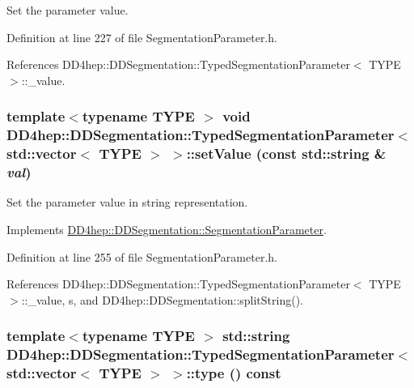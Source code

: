 Set the parameter value. 

Definition at line 227 of file SegmentationParameter.h.

References DD4hep::DDSegmentation::TypedSegmentationParameter$<$ TYPE $>$::\_\-value.\hypertarget{class_d_d4hep_1_1_d_d_segmentation_1_1_typed_segmentation_parameter_3_01std_1_1vector_3_01_t_y_p_e_01_4_01_4_ad36f5a4953d42c4d9252423f129c50de}{
\subsubsection[{setValue}]{\setlength{\rightskip}{0pt plus 5cm}template$<$typename TYPE $>$ void {\bf DD4hep::DDSegmentation::TypedSegmentationParameter}$<$ std::vector$<$ TYPE $>$ $>$::setValue (const std::string \& {\em val})}}
\label{class_d_d4hep_1_1_d_d_segmentation_1_1_typed_segmentation_parameter_3_01std_1_1vector_3_01_t_y_p_e_01_4_01_4_ad36f5a4953d42c4d9252423f129c50de}


Set the parameter value in string representation. 

Implements \hyperlink{class_d_d4hep_1_1_d_d_segmentation_1_1_segmentation_parameter_a91e9dae172660687daec4de4d730b192}{DD4hep::DDSegmentation::SegmentationParameter}.

Definition at line 255 of file SegmentationParameter.h.

References DD4hep::DDSegmentation::TypedSegmentationParameter$<$ TYPE $>$::\_\-value, s, and DD4hep::DDSegmentation::splitString().\hypertarget{class_d_d4hep_1_1_d_d_segmentation_1_1_typed_segmentation_parameter_3_01std_1_1vector_3_01_t_y_p_e_01_4_01_4_af67d8bae82f853555d805111b1794553}{
\subsubsection[{type}]{\setlength{\rightskip}{0pt plus 5cm}template$<$typename TYPE $>$ std::string {\bf DD4hep::DDSegmentation::TypedSegmentationParameter}$<$ std::vector$<$ TYPE $>$ $>$::type () const}}
\label{class_d_d4hep_1_1_d_d_segmentation_1_1_typed_segmentation_parameter_3_01std_1_1vector_3_01_t_y_p_e_01_4_01_4_af67d8bae82f853555d805111b1794553}


